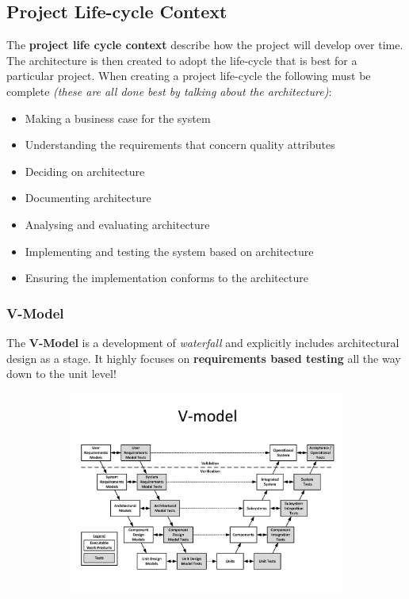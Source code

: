 \documentclass[a4paper]{article}
\begin{document}
\subsection{Project Life-cycle Context}
The \textbf{project life cycle context} describe how the project will develop over time. The architecture is then created to adopt the life-cycle that is best for a particular project. When creating a project life-cycle the following must be complete \textit{(these are all done best by talking about the architecture)}:
\begin{itemize}
\item Making a business case for the system
\item Understanding the requirements that concern quality attributes
\item Deciding on architecture
\item Documenting architecture
\item Analysing and evaluating architecture
\item Implementing and testing the system based on architecture
\item Ensuring the implementation conforms to the architecture
\end{itemize}

\subsubsection{V-Model}
The \textbf{V-Model} is a development of \textit{waterfall} and explicitly includes architectural design as a stage. It highly focuses on \textbf{requirements based testing} all the way down to the unit level!

\begin{figure}[H]
\hskip-2.5cm\begin{subfigure}{1.2\textwidth}
  \includegraphics[width=1.2\linewidth]
  {images/3-v-model.png}
\end{subfigure}
\end{figure}
\end{document}
